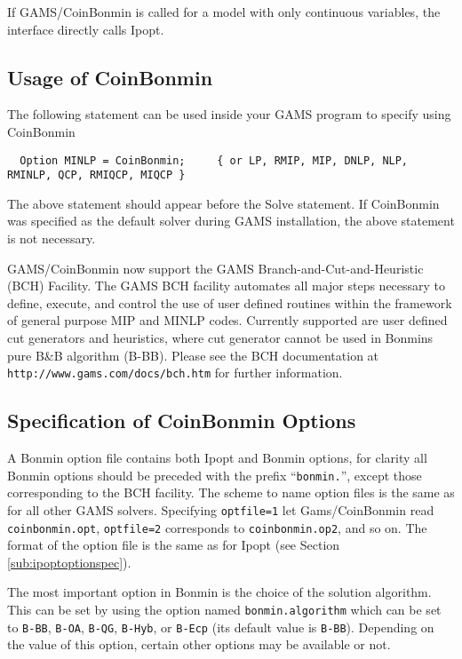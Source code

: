 If GAMS/CoinBonmin is called for a model with only continuous variables, the interface directly calls Ipopt.

\subsection{Usage of CoinBonmin}

The following statement can be used inside your GAMS program to specify using CoinBonmin
\begin{verbatim}
  Option MINLP = CoinBonmin;     { or LP, RMIP, MIP, DNLP, NLP, RMINLP, QCP, RMIQCP, MIQCP }
\end{verbatim}

The above statement should appear before the Solve statement.
If CoinBonmin was specified as the default solver during GAMS installation, the above statement is not necessary.

GAMS/CoinBonmin now support the GAMS Branch-and-Cut-and-Heuristic (BCH) Facility.
The GAMS BCH facility automates all major steps necessary to define, execute, and control the use of user defined routines within the framework of general purpose MIP and MINLP codes.
Currently supported are user defined cut generators and heuristics, where cut generator cannot be used in Bonmins pure B\&B algorithm (B-BB).
Please see the BCH documentation at \texttt{http://www.gams.com/docs/bch.htm} for further information.

\subsection{Specification of CoinBonmin Options}
\label{sub:bonminoptionspec}

A Bonmin option file contains both Ipopt and Bonmin options, for clarity all Bonmin options should be preceded with the prefix ``\texttt{bonmin.}'', except those corresponding to the BCH facility.
The scheme to name option files is the same as for all other GAMS solvers.
Specifying \texttt{optfile=1} let Gams/CoinBonmin read \texttt{coinbonmin.opt}, \texttt{optfile=2} corresponds to \texttt{coinbonmin.op2}, and so on.
The format of the option file is the same as for Ipopt (see Section \ref{sub:ipoptoptionspec}).

The most important option in Bonmin is the choice of the solution algorithm.
This can be set by using the option named \texttt{bonmin.algorithm} which can be set to \texttt{B-BB}, \texttt{B-OA}, \texttt{B-QG}, \texttt{B-Hyb}, or \texttt{B-Ecp} (its default value is \texttt{B-BB}).
Depending on the value of this option, certain other options may be available or not.

